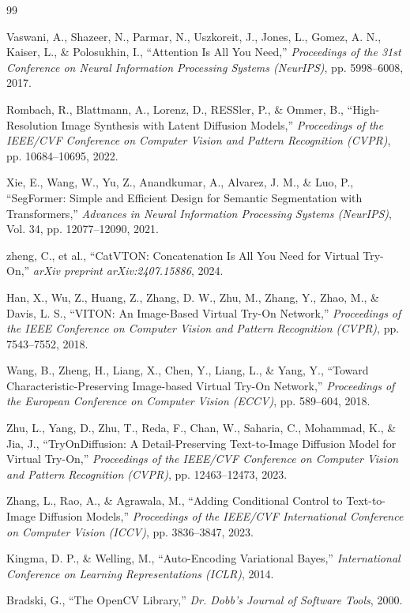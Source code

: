 \documentclass[12pt, a4paper]{report}
\begin{document}
\begin{thebibliography}{99}

Vaswani, A., Shazeer, N., Parmar, N., Uszkoreit, J., Jones, L., Gomez, A. N., Kaiser, L., \& Polosukhin, I.,
``Attention Is All You Need,''
\textit{Proceedings of the 31st Conference on Neural Information Processing Systems (NeurIPS)},
pp. 5998--6008, 2017.

Rombach, R., Blattmann, A., Lorenz, D., RESSler, P., \& Ommer, B.,
``High-Resolution Image Synthesis with Latent Diffusion Models,''
\textit{Proceedings of the IEEE/CVF Conference on Computer Vision and Pattern Recognition (CVPR)},
pp. 10684--10695, 2022.

Xie, E., Wang, W., Yu, Z., Anandkumar, A., Alvarez, J. M., \& Luo, P.,
``SegFormer: Simple and Efficient Design for Semantic Segmentation with Transformers,''
\textit{Advances in Neural Information Processing Systems (NeurIPS)},
Vol. 34, pp. 12077--12090, 2021.

zheng, C., et al.,
``CatVTON: Concatenation Is All You Need for Virtual Try-On,''
\textit{arXiv preprint arXiv:2407.15886},
2024.

Han, X., Wu, Z., Huang, Z., Zhang, D. W., Zhu, M., Zhang, Y., Zhao, M., \& Davis, L. S.,
``VITON: An Image-Based Virtual Try-On Network,''
\textit{Proceedings of the IEEE Conference on Computer Vision and Pattern Recognition (CVPR)},
pp. 7543--7552, 2018.

Wang, B., Zheng, H., Liang, X., Chen, Y., Liang, L., \& Yang, Y.,
``Toward Characteristic-Preserving Image-based Virtual Try-On Network,''
\textit{Proceedings of the European Conference on Computer Vision (ECCV)},
pp. 589--604, 2018.

Zhu, L., Yang, D., Zhu, T., Reda, F., Chan, W., Saharia, C., Mohammad, K., & Jia, J.,
``TryOnDiffusion: A Detail-Preserving Text-to-Image Diffusion Model for Virtual Try-On,''
\textit{Proceedings of the IEEE/CVF Conference on Computer Vision and Pattern Recognition (CVPR)},
pp. 12463--12473, 2023.

Zhang, L., Rao, A., \& Agrawala, M.,
``Adding Conditional Control to Text-to-Image Diffusion Models,''
\textit{Proceedings of the IEEE/CVF International Conference on Computer Vision (ICCV)},
pp. 3836--3847, 2023.

Kingma, D. P., \& Welling, M.,
``Auto-Encoding Variational Bayes,''
\textit{International Conference on Learning Representations (ICLR)},
2014.

Bradski, G.,
``The OpenCV Library,''
\textit{Dr. Dobb's Journal of Software Tools},
2000.

\end{thebibliography}
\end{document}
